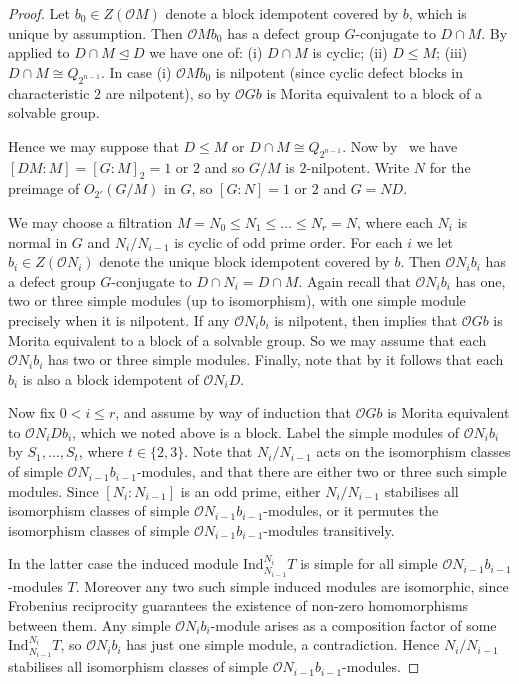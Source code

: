 \documentclass{amsart}
\theoremstyle{plain}\newtheorem{Theorem}{Theorem}[section]
\theoremstyle{plain}\newtheorem{Conjecture}[Theorem]{Conjecture}
\theoremstyle{plain}\newtheorem{Corollary}[Theorem]{Corollary}
\theoremstyle{plain}\newtheorem{Lemma}[Theorem]{Lemma}
\theoremstyle{plain}\newtheorem{Proposition}[Theorem]{Proposition}
\theoremstyle{definition}\newtheorem{Definition}[Theorem]{Definition}
\theoremstyle{definition}\newtheorem{Example}[Theorem]{Example}
\theoremstyle{definition}\newtheorem{Examples}[Theorem]{Examples}
\theoremstyle{definition}\newtheorem{Exercise}[Theorem]{Exercise}
\theoremstyle{definition}\newtheorem{Notation}[Theorem]{Notation}
\theoremstyle{definition}\newtheorem{Remark}[Theorem]{Remark}
\theoremstyle{definition}\newtheorem{Remarks}[Theorem]{Remarks}
\def\CO{{\mathcal{O}}}    \def\OPE{{\mathcal{O}(P\rtimes E)}}
\def\Ind{\mathrm{Ind}}    \def\tenC{\otimes_C}
\numberwithin{equation}{section}
\begin{document}
\begin{proof}
Let $b_0 \in Z(\CO M)$ denote a block idempotent covered by $b$, which is unique by assumption. Then $\CO Mb_0$ has a defect group $G$-conjugate to $D\cap M$. By  applied to $D \cap M \unlhd D$ we have one of: (i) $D \cap M$ is cyclic; (ii) $D \leq M$; (iii) $D \cap M \cong Q_{2^{n-1}}$. In case (i) $\CO Mb_0$ is nilpotent (since cyclic defect blocks in characteristic $2$ are nilpotent), so by
 $\CO Gb$ is Morita equivalent to a block of a solvable group. 


Hence we may suppose that $D \leq M$ or $D \cap M \cong Q_{2^{n-1}}$. Now by~\cite[Lem.~2.4]{ar19} we have $[DM:M]=[G:M]_2=1$ or $2$ and so $G/M$ is $2$-nilpotent. Write $N$ for the preimage of $O_{2'}(G/M)$ in $G$, so $[G:N]=1$ or $2$ and $G=ND$.

We may choose a filtration $M=N_0\leq N_1 \leq \ldots\leq N_r = N$, where each $N_i$ is normal in $G$ and $N_i/N_{i-1}$ is cyclic of odd prime order. For each $i$ we let $b_i\in Z(\CO N_i)$ denote the unique block idempotent covered by $b$. Then $\CO N_ib_i$ has a defect group $G$-conjugate to $D\cap N_i=D\cap M$. Again recall that $\CO N_ib_i$ has one, two or three simple modules (up to isomorphism), with one simple module precisely when it is nilpotent. If any $\CO N_ib_i$ is nilpotent, then  implies that $\CO Gb$ is Morita equivalent to a block of a solvable group. So we may assume that each $\CO N_ib_i$ has two or three simple modules. Finally, note that by  it follows that each $b_i$ is also a block idempotent of $\CO N_i D$.
  
Now fix $0< i \leq r$, and assume by way of induction that $\CO G b$ is Morita equivalent to $\CO N_i Db_i$, which we noted above is a block. Label the simple modules of $\CO N_i b_i$ by $S_1,\ldots, S_t$, where $t\in \{2,3\}$. Note that $N_i/N_{i-1}$ acts on the isomorphism classes of simple $\CO N_{i-1}b_{i-1}$-modules, and that there are either two or three such simple modules. Since $[N_i : N_{i-1}]$ is an odd prime, either $N_i/N_{i-1}$ stabilises all isomorphism classes of simple $\CO N_{i-1}b_{i-1}$-modules, or it permutes the isomorphism classes of simple $\CO N_{i-1}b_{i-1}$-modules transitively.
 
In the latter case the induced module $\Ind_{N_{i-1}}^{N_i} T$ is simple for all simple $\CO N_{i-1}b_{i-1}$-modules $T$. Moreover any two such simple induced modules are isomorphic, since Frobenius reciprocity guarantees the existence of non-zero homomorphisms between them. Any simple $\CO N_i b_i$-module arises as a composition factor of some $\Ind_{N_{i-1}}^{N_i} T$, so $\CO N_i b_i$ has just one simple module, a contradiction. Hence $N_i/N_{i-1}$ stabilises all isomorphism classes of simple $\CO N_{i-1}b_{i-1}$-modules.


\end{proof}
\end{document}
